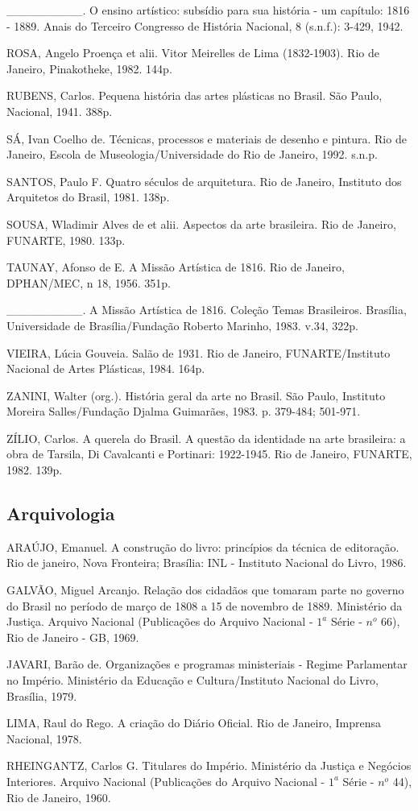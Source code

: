 \_\_\_\_\_\_\_\_\_. O ensino artístico: subsídio para sua história - um capítulo: 1816 - 1889. Anais do Terceiro Congresso de História Nacional, 8 (s.n.f.): 3-429, 1942.

ROSA, Angelo Proença et alii. Vitor Meirelles de Lima (1832-1903). Rio de Janeiro, Pinakotheke, 1982. 144p.

RUBENS, Carlos. Pequena história das artes plásticas no Brasil. São Paulo, Nacional, 1941. 388p.

SÁ, Ivan Coelho de. Técnicas, processos e materiais de desenho e pintura. Rio de Janeiro, Escola de Museologia/Universidade do Rio de Janeiro, 1992. s.n.p.

SANTOS, Paulo F. Quatro séculos de arquitetura. Rio de Janeiro, Instituto dos Arquitetos do Brasil, 1981. 138p.

SOUSA, Wladimir Alves de et alii. Aspectos da arte brasileira. Rio de Janeiro, FUNARTE, 1980. 133p.

TAUNAY, Afonso de E. A Missão Artística de 1816. Rio de Janeiro, DPHAN/MEC, n 18, 1956. 351p.

\_\_\_\_\_\_\_\_\_. A Missão Artística de 1816. Coleção Temas Brasileiros. Brasília, Universidade de Brasília/Fundação Roberto Marinho, 1983. v.34, 322p.

VIEIRA, Lúcia Gouveia. Salão de 1931. Rio de Janeiro, FUNARTE/Instituto Nacional de Artes Plásticas, 1984. 164p.

ZANINI, Walter (org.). História geral da arte no Brasil. São Paulo, Instituto Moreira Salles/Fundação Djalma Guimarães, 1983. p. 379-484; 501-971.

ZÍLIO, Carlos. A querela do Brasil. A questão da identidade na arte brasileira: a obra de Tarsila, Di Cavalcanti e Portinari: 1922-1945. Rio de Janeiro, FUNARTE, 1982. 139p.

\subsection{Arquivologia}

ARAÚJO, Emanuel. A construção do livro: princípios da técnica de editoração. Rio de janeiro, Nova Fronteira; Brasília: INL - Instituto Nacional do Livro, 1986.

GALVÃO, Miguel Arcanjo. Relação dos cidadãos que tomaram parte no governo do Brasil no período de março de 1808 a 15 de novembro de 1889. Ministério da Justiça. Arquivo Nacional (Publicações do Arquivo Nacional - $1^a$ Série - $n^o$ 66), Rio de Janeiro - GB, 1969.

JAVARI, Barão de. Organizações e programas ministeriais - Regime Parlamentar no Império. Ministério da Educação e Cultura/Instituto Nacional do Livro, Brasília, 1979.

LIMA, Raul do Rego. A criação do Diário Oficial. Rio de Janeiro, Imprensa Nacional, 1978.

RHEINGANTZ, Carlos G. Titulares do Império. Ministério da Justiça e Negócios Interiores. Arquivo Nacional (Publicações do Arquivo Nacional - $1^a$ Série - $n^o$ 44), Rio de Janeiro, 1960.